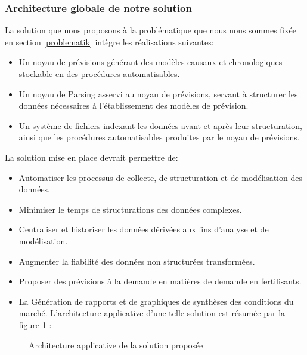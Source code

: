 	\subsubsection{Architecture globale de notre solution}
	La solution que nous proposons à la problématique que nous nous sommes fixée en section \ref{problematik} intègre les réalisations suivantes:\begin{itemize}
	\item Un noyau de prévisions générant des modèles causaux et chronologiques stockable en des procédures automatisables.
	\item Un noyau de Parsing asservi au noyau de prévisions, servant à structurer les données nécessaires à l'établissement des modèles de prévision.
	\item Un système de fichiers indexant les données avant et après leur structuration, ainsi que les procédures automatisables produites par le noyau de prévisions.
	\end{itemize}
	La solution mise en place devrait permettre de:
	\begin{itemize}
	\item Automatiser les processus de collecte, de structuration et de modélisation des données.
	\item Minimiser le temps de structurations des données complexes.
	\item Centraliser et historiser les données dérivées aux fins d'analyse et de modélisation.
	\item Augmenter la fiabilité des données non structurées transformées.
	\item Proposer des prévisions à la demande en matières de demande en fertilisants.
	\item La Génération de rapports et de graphiques de synthèses des conditions du marché.
	L'architecture applicative d'une telle solution est résumée par la figure \ref{fig:archi} :
	\end{itemize}
			\begin{figure}[H]
					\centering
					\caption{Architecture applicative de la solution proposée}					
					\label{fig:archi}
			\end{figure}
